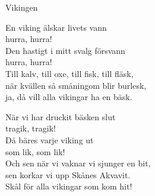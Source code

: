 \begin{song}{Vikingen}
	
	
	
	En viking älskar livets vann\\
	hurra, hurra!\\
	Den hastigt i mitt svalg försvann\\
	hurra, hurra!\\
	Till kalv, till oxe, till fisk, till fläsk,\\
	när kvällen så småningom blir burlesk,\\
	ja, då vill alla vikingar ha en bäsk.
	
	När vi har druckit bäsken slut\\
	tragik, tragik!\\
	Då bäres varje viking ut\\
	som lik, som lik!\\
	Och sen när vi vaknar vi sjunger en bit,\\
	sen korkar vi upp Skånes Akvavit.\\
	Skål för alla vikingar som kom hit!
	
\end{song}
